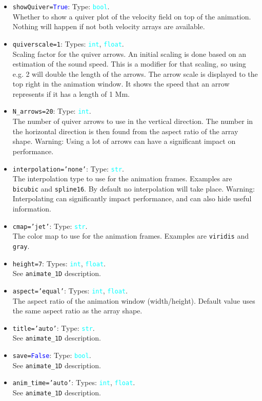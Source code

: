 \documentclass{article}
\newcommand{\ttt}[1]{\texttt{#1}}
\newcommand{\ptype}[1]{\texttt{\textcolor{cyan}{#1}}}
\newcommand{\cbl}[1]{\textcolor{blue}{#1}}
\newcommand{\cro}[1]{\textcolor{RedOrange}{#1}}
\newcommand{\cyo}[1]{\textcolor{YellowOrange}{#1}}
\begin{document}
\begin{itemize}
	\item \ttt{\cro{showQuiver}=\cbl{True}}: Type: \ptype{bool}.\\Whether to show a quiver plot of the velocity field on top of the animation. Nothing will happen if not both velocity arrays are available.
	\item \ttt{\cro{quiverscale}=1}: Types: \ptype{int}, \ptype{float}.\\Scaling factor for the quiver arrows. An initial scaling is done based on an estimation of the sound speed. This is a modifier for that scaling, so using e.g. 2 will double the length of the arrows. The arrow scale is displayed to the top right in the animation window. It shows the speed that an arrow represents if it has a length of 1 Mm.
	\item \ttt{\cro{N\_arrows}=20}: Type: \ptype{int}.\\The number of quiver arrows to use in the vertical direction. The number in the horizontal direction is then found from the aspect ratio of the array shape. Warning: Using a lot of arrows can have a significant impact on performance.
	\item \ttt{\cro{interpolation}=\cyo{'none'}}: Type: \ptype{str}.\\The interpolation type to use for the animation frames. Examples are \ttt{bicubic} and \ttt{spline16}. By default no interpolation will take place. Warning: Interpolating can significantly impact performance, and can also hide useful information.
	\item \ttt{\cro{cmap}=\cyo{'jet'}}: Type: \ptype{str}.\\The color map to use for the animation frames. Examples are \ttt{viridis} and \ttt{gray}.
	\item \ttt{\cro{height}=7}: Types: \ptype{int}, \ptype{float}.\\See \ttt{animate\_1D} description.
	\item \ttt{\cro{aspect}=\cyo{'equal'}}: Types: \ptype{int}, \ptype{float}.\\The aspect ratio of the animation window (width/height). Default value uses the same aspect ratio as the array shape.
	\item \ttt{\cro{title}=\cyo{'auto'}}: Type: \ptype{str}.\\See \ttt{animate\_1D} description.
	\item \ttt{\cro{save}=\cbl{False}}: Type: \ptype{bool}.\\See \ttt{animate\_1D} description.
	\item \ttt{\cro{anim\_time}=\cyo{'auto'}}: Types: \ptype{int}, \ptype{float}.\\See \ttt{animate\_1D} description.

\end{itemize}
\end{document}
